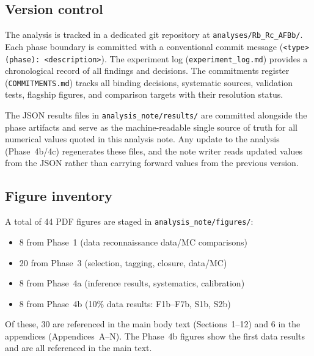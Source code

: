 \documentclass[11pt,a4paper]{article}
\begin{document}
\subsection{Version control}

The analysis is tracked in a dedicated git repository at
\texttt{analyses/Rb\_Rc\_AFBb/}. Each phase boundary is committed with a
conventional commit message (\texttt{<type>(phase): <description>}). The
experiment log (\texttt{experiment\_log.md}) provides a chronological record
of all findings and decisions. The commitments register (\texttt{COMMITMENTS.md})
tracks all binding decisions, systematic sources, validation tests, flagship
figures, and comparison targets with their resolution status.

The JSON results files in \texttt{analysis\_note/results/} are committed alongside
the phase artifacts and serve as the machine-readable single source of truth for
all numerical values quoted in this analysis note. Any update to the analysis
(Phase~4b/4c) regenerates these files, and the note writer reads updated values
from the JSON rather than carrying forward values from the previous version.

\subsection{Figure inventory}

A total of 44 PDF figures are staged in \texttt{analysis\_note/figures/}:
\begin{itemize}
\item 8 from Phase~1 (data reconnaissance data/MC comparisons)
\item 20 from Phase~3 (selection, tagging, closure, data/MC)
\item 8 from Phase~4a (inference results, systematics, calibration)
\item 8 from Phase~4b (10\% data results: F1b--F7b, S1b, S2b)
\end{itemize}

Of these, 30 are referenced in the main body text (Sections~1--12) and 6 in
the appendices (Appendices~A--N). The Phase~4b figures show the first data results
and are all referenced in the main text.
\end{document}
